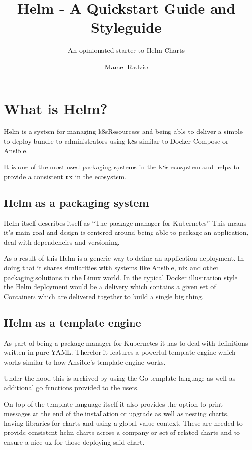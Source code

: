 \documentclass[english]{scrbook}
\title{Helm - A Quickstart Guide and Styleguide}
\subtitle{An opinionated starter to Helm Charts}
\author{Marcel Radzio}
\begin{document}
\maketitle
\tableofcontents

\chapter{What is Helm?}
Helm is a system for managing \Glspl{k8sResources} and being able to deliver a simple to deploy bundle to administrators using \Gls{k8s} similar to Docker Compose or Ansible.

It is one of the most used packaging systems in the \Gls{k8s} ecosystem and helps to provide a consistent \gls{ux} in the ecosystem.

\section{Helm as a packaging system}
Helm itself describes itself as \enquote{The package manager for Kubernetes}\cite{helmauthorsHelm}
This means it's main goal and design is centered around being able to package an application, deal with dependencies and versioning.

As a result of this Helm is a generic way to define an application deployment.
In doing that it shares similarities with systems like Ansible, nix and other packaging solutions in the Linux world. 
In the typical Docker illustration style the Helm deployment would be a delivery which contains a given set of Containers which are delivered together to build a single big thing.

\section{Helm as a template engine}
As part of being a package manager for Kubernetes it has to deal with definitions written in pure YAML.
Therefor it features a powerful template engine which works similar to how Ansible's template engine works.

Under the hood this is archived by using the Go template language\cite{helmauthorsTemplateFunctionsPipelines,thegoauthorsTemplatePackageText} as well as additional go functions provided to the users.

On top of the template language itself it also provides the option to print messages at the end of the installation or upgrade as  well as nesting charts, having libraries for charts and using a global value context.
These are needed to provide consistent helm charts across a company or set of related charts and to ensure a nice \gls{ux} for those deploying said chart.
\end{document}
